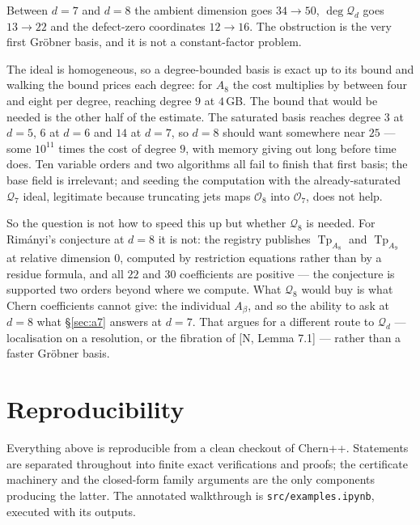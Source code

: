 \documentclass[11pt,a4paper]{article}
\DeclareMathOperator{\Tp}{Tp}
\newcommand{\Qd}{\mathcal{Q}}
\theoremstyle{plain}
\theoremstyle{definition}
\theoremstyle{remark}
\begin{document}
Between $d = 7$ and $d = 8$ the ambient dimension goes $34 \to 50$, $\deg\Qd_d$ goes $13 \to 22$
and the defect-zero coordinates $12 \to 16$. The obstruction is the very first Gr\"obner basis, and
it is not a constant-factor problem.

The ideal is homogeneous, so a degree-bounded basis is exact up to its bound and walking the bound
prices each degree: for $A_8$ the cost multiplies by between four and eight per degree, reaching
degree $9$ at $4$\,GB. The bound that would be needed is the other half of the estimate. The
saturated basis reaches degree $3$ at $d = 5$, $6$ at $d = 6$ and $14$ at $d = 7$, so $d = 8$
should want somewhere near $25$ --- some $10^{11}$ times the cost of degree $9$, with memory giving
out long before time does. Ten variable orders and two algorithms all fail to finish that first
basis; the base field is irrelevant; and seeding the computation with the already-saturated $\Qd_7$
ideal, legitimate because truncating jets maps $\mathcal{O}_8$ into $\mathcal{O}_7$, does not help.

So the question is not how to speed this up but whether $\Qd_8$ is needed. For Rim\'anyi's
conjecture at $d = 8$ it is not: the registry publishes $\Tp_{A_8}$ and $\Tp_{A_9}$ at relative
dimension $0$, computed by restriction equations rather than by a residue formula, and all $22$ and
$30$ coefficients are positive --- the conjecture is supported two orders beyond where we compute.
What $\Qd_8$ would buy is what Chern coefficients cannot give: the individual $A_\beta$, and so the
ability to ask at $d = 8$ what \S\ref{sec:a7} answers at $d = 7$. That argues for a different route
to $\Qd_d$ --- localisation on a resolution, or the fibration of [N, Lemma 7.1] --- rather than a
faster Gr\"obner basis.

\section*{Reproducibility}

Everything above is reproducible from a clean checkout of Chern++. Statements are separated
throughout into finite exact verifications and proofs; the certificate machinery and the
closed-form family arguments are the only components producing the latter. The annotated
walkthrough is \texttt{src/examples.ipynb}, executed with its outputs.
\end{document}

